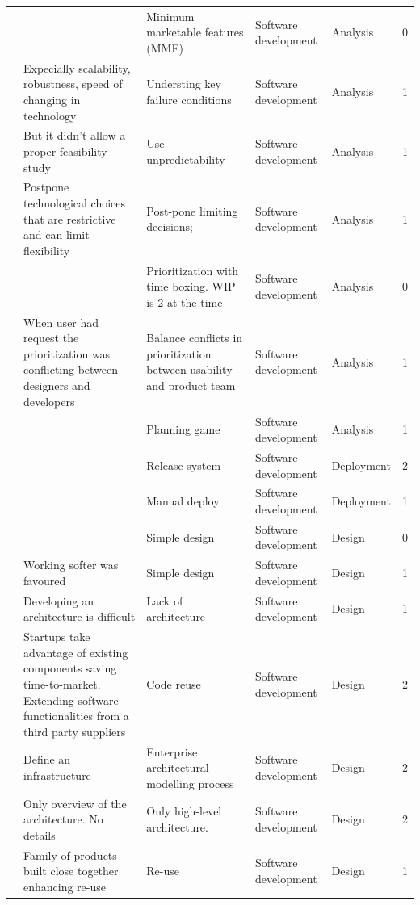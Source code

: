 \documentclass[final,5p,times,twocolumn]{elsarticle}
\begin{document}
\begin{center}
\begin{longtable}{|p{0.36in}|p{2.6in}|p{1.2in}|p{0.9in}|p{0.9in}|p{0.2in}|}
\cite{Taipale2010} &       & Minimum marketable features (MMF) & Software development & Analysis & 0 \\
\cite{Mater2000} & Expecially scalability, robustness, speed of changing in technology & Understing key failure conditions & Software development & Analysis & 1 \\
\cite{Mirel2000} & But it didn't allow a proper feasibility study & Use unpredictability & Software development & Analysis & 1 \\
\cite{Midler2008} & Postpone technological choices that are restrictive and can limit flexibility & Post-pone limiting decisions; & Software development & Analysis & 1 \\
\cite{Taipale2010} &       & Prioritization with time boxing. WIP is 2 at the time & Software development & Analysis & 0 \\
\cite{Mirel2000} & When user had request the prioritization was conflicting between designers and developers & Balance conflicts in prioritization between usability and product team & Software development & Analysis & 1 \\
\cite{Silva2005} &       & Planning game  & Software development & Analysis & 1 \\
\cite{Zettel2001} &       & Release system & Software development & Deployment & 2 \\
\cite{Silva2005} &       & Manual deploy & Software development & Deployment & 1 \\
\cite{Taipale2010} &       & Simple design & Software development & Design & 0 \\
\cite{Tingling2007} & Working softer was favoured & Simple design & Software development & Design & 1 \\
\cite{Deias} & Developing an architecture is difficult & Lack of architecture & Software development & Design & 1 \\
\cite{Jansen2008} & Startups take advantage of existing components saving time-to-market. Extending software functionalities from a third party suppliers & Code reuse & Software development & Design & 2 \\
\cite{Ambler2002} & Define an infrastructure & Enterprise architectural modelling process & Software development & Design & 2 \\
\cite{Ambler2002} & Only overview of the architecture. No details & Only high-level architecture. & Software development & Design & 2 \\
\cite{Camel1994a} & Family of products built close together enhancing re-use  & Re-use & Software development & Design & 1 \\

\end{longtable}
\end{center}
\end{document}
